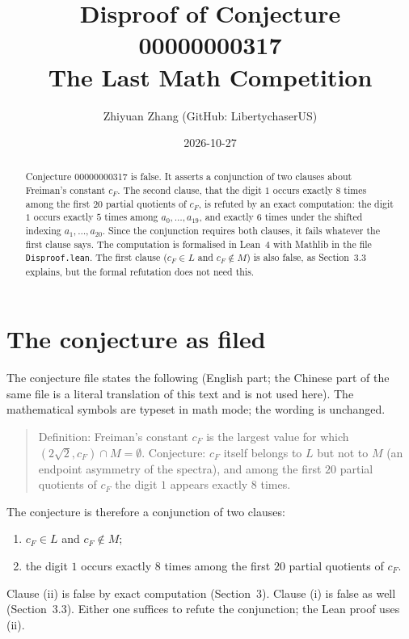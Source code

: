 \documentclass[11pt]{article}
\title{Disproof of Conjecture 00000000317\\[0.3em]\large The Last Math Competition}
\author{Zhiyuan Zhang (GitHub: LibertychaserUS)}
\date{2026-10-27}
\begin{document}
\maketitle

\begin{abstract}
Conjecture 00000000317 is false. It asserts a conjunction of two clauses about Freiman's
constant $c_F$. The second clause, that the digit $1$ occurs exactly $8$ times among the first
$20$ partial quotients of $c_F$, is refuted by an exact computation: the digit $1$ occurs exactly
$5$ times among $a_0,\dots,a_{19}$, and exactly $6$ times under the shifted indexing
$a_1,\dots,a_{20}$. Since the conjunction requires both clauses, it fails whatever the first
clause says. The computation is formalised in Lean~4 with Mathlib in the file \texttt{Disproof.lean}.
The first clause ($c_F \in L$ and $c_F \notin M$) is also false, as Section~3.3 explains, but the
formal refutation does not need this.
\end{abstract}

\section{The conjecture as filed}

The conjecture file states the following (English part; the Chinese part of the same file is a
literal translation of this text and is not used here). The mathematical symbols are typeset in
math mode; the wording is unchanged.

\begin{quote}
Definition: Freiman's constant $c_F$ is the largest value for which $(2\sqrt{2}, c_F) \cap M = \emptyset$.
Conjecture: $c_F$ itself belongs to $L$ but not to $M$ (an endpoint asymmetry of the spectra),
and among the first $20$ partial quotients of $c_F$ the digit $1$ appears exactly $8$ times.
\end{quote}

The conjecture is therefore a conjunction of two clauses:
\begin{enumerate}
\item[(i)] $c_F \in L$ and $c_F \notin M$;
\item[(ii)] the digit $1$ occurs exactly $8$ times among the first $20$ partial quotients of $c_F$.
\end{enumerate}
Clause (ii) is false by exact computation (Section~3). Clause (i) is false as well (Section~3.3).
Either one suffices to refute the conjunction; the Lean proof uses (ii).
\end{document}
